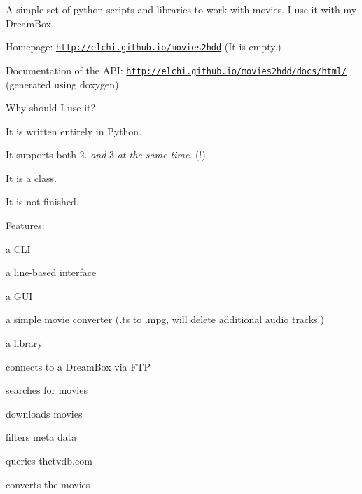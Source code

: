 A simple set of python scripts and libraries to work with movies. I use it with my Dream\-Box.
\begin{DoxyItemize}
\item Homepage\-: \href{http://elchi.github.io/movies2hdd}{\tt http\-://elchi.\-github.\-io/movies2hdd} (It is empty.)
\item Documentation of the A\-P\-I\-: \href{http://elchi.github.io/movies2hdd/docs/html/}{\tt http\-://elchi.\-github.\-io/movies2hdd/docs/html/} (generated using doxygen) 


\end{DoxyItemize}

Why should I use it?
\begin{DoxyItemize}
\item It is written entirely in Python.
\item It supports both 2. {\itshape and} 3 {\itshape at the same time}. (!)
\item It is a class.
\item It is not finished. 


\end{DoxyItemize}

Features\-:
\begin{DoxyItemize}
\item a C\-L\-I
\begin{DoxyItemize}
\item a line-\/based interface
\item a G\-U\-I
\item a simple movie converter (.ts to .mpg, will delete additional audio tracks!)
\end{DoxyItemize}
\item a library
\begin{DoxyItemize}
\item connects to a Dream\-Box via F\-T\-P
\item searches for movies
\item downloads movies
\item filters meta data
\item queries thetvdb.\-com
\item converts the movies 
\end{DoxyItemize}
\end{DoxyItemize}